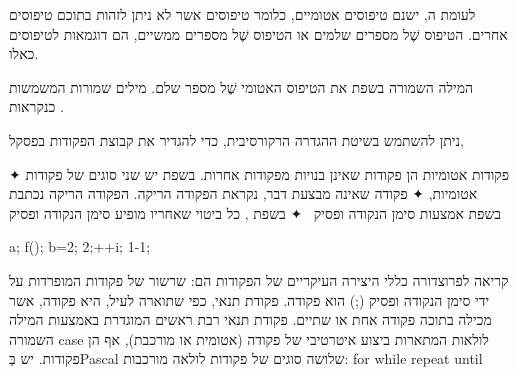 לעומת ה, ישנם טיפוסים אטומיים, כלומר
טיפוסים אשר לא ניתן לזהות בתוכם טיפוסים אחרים. הטיפוס שֶׁל מספרים שלמים או
הטיפוס שֶׁל מספרים ממשיים, הם דוגמאות לטיפוסים כאלו.

המילה השמורה  בשפת   את הטיפוס האטומי שֶׁל מספר שלם.
מילים
שמורות המשמשות כ נקראות .

ניתן להשתמש בשיטת ההגדרה הרקורסיבית, כדי להגדיר את קבוצת הפקודות בפסקל,

✦ פקודות אטומיות הן פקודות שאינן בנויות מפקודות אחרות. בשפת  יש שני סוגים של פקודות אטומיות,
✦ פקודה שאינה מבצעת דבר, נקראת הפקודה הריקה. הפקודה הריקה נכתבת בשפת אמצעות סימן הנקודה ופסיק~\cc{;}
✦ בשפת , כל ביטוי שאחריו מופיע סימן הנקודה ופסיק~\cc{;}
\begin{CPP}
  a; f(); b=2; 2;++i; 1-1;
\end{CPP}
קריאה לפרוצדורה
כללי היצירה העיקריים של הפקודות הם:
שרשור של פקודות המופרדות על ידי סימן הנקודה ופסיק (;) הוא פקודה.
פקודת תנאי, כפי שתוארה לעיל, היא פקודה, אשר מכילה בתוכה פקודה אחת או שתיים.
פקודת תנאי רבת ראשים המוגדרת באמצעות המילה השמורה case
לולאות המתארות ביצוע איטרטיבי של פקודה (אטומית או מורכבת), אף הן פקודות. יש בְּPascal שלושה סוגים של פקודות לולאה מורכבות:
for
while
repeat until

